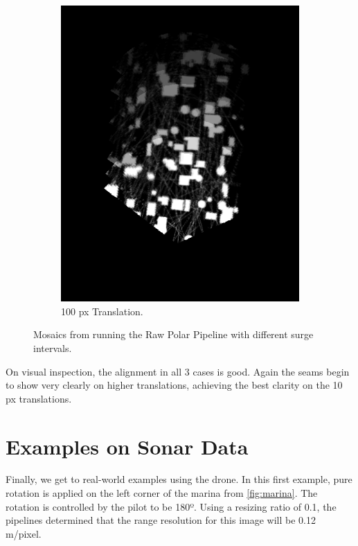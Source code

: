 \begin{figure}[H]
\begin{subfigure}[b]{0.47\textwidth}
        \includegraphics[width=\textwidth]{figures/results/Translation-Surge-Combined/PC-9.png}
        \caption{100 px Translation.}
    \end{subfigure}
    \hfill
    \caption{Mosaics from running the Raw Polar Pipeline with different surge intervals.}
\end{figure}

On visual inspection, the alignment in all 3 cases is good. Again the seams begin to show very clearly on higher translations, achieving the best clarity on the 10 px translations. 


\section{Examples on Sonar Data}

Finally, we get to real-world examples using the drone. In this first example, pure rotation is applied on the left corner of the marina from \autoref{fig:marina}. The rotation is controlled by the pilot to be 180º. Using a resizing ratio of 0.1, the pipelines determined that the range resolution for this image will be 0.12 m/pixel.

